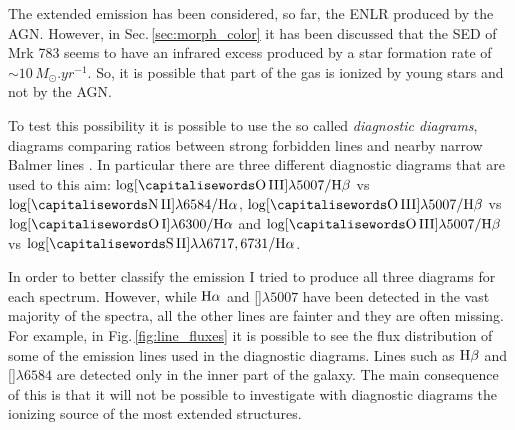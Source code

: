 \documentclass[../main.tex]{subfiles}
\begin{document}
The extended emission has been considered, so far, the ENLR produced by the AGN.
However, in Sec.\,\ref{sec:morph_color} it has been discussed that the SED of Mrk 783 seems to have an infrared excess produced by a star formation rate of $\sim 10\,\si{M_{\odot}.yr^{-1}}$.
So, it is possible that part of the gas is ionized by young stars and not by the AGN.

To test this possibility it is possible to use the so called \emph{diagnostic diagrams}, diagrams comparing ratios between strong forbidden lines and nearby narrow Balmer lines \citep{Baldwin81,Veilleux87}.
In particular there are three different diagnostic diagrams that are used to this aim: $\log [\rm \ion{O}{III}]\lambda5007/\Hb$ vs $\log [\rm \ion{N}{II}]\lambda6584/\Ha$, $\log [\rm \ion{O}{III}]\lambda5007/\Hb$ vs $\log [\rm \ion{O}{I}]\lambda6300/\Ha$ and $\log [\rm \ion{O}{III}]\lambda5007/\Hb$ vs $\log [\rm \ion{S}{II}]\lambda\lambda6717,6731/\Ha$.

In order to better classify the emission I tried to produce all three diagrams for each spectrum.
However, while $\rm H\alpha$ and []$\lambda5007$ have been detected in the vast majority of the spectra, all the other lines are fainter and they are often missing.
For example, in Fig.\,\ref{fig:line_fluxes} it is possible to see the flux distribution of some of the emission lines used in the diagnostic diagrams.
Lines such as $\rm H\beta$ and []$\lambda6584$ are detected only in the inner part of the galaxy.
The main consequence of this is that it will not be possible to investigate with diagnostic diagrams the ionizing source of the most extended structures.
\end{document}
